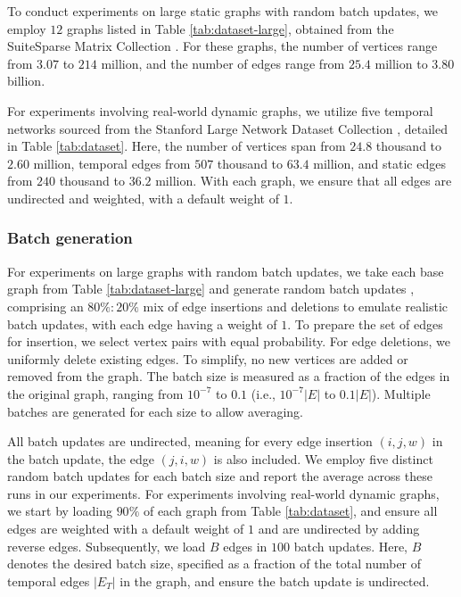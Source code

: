 To conduct experiments on large static graphs with random batch updates, we employ $12$ graphs listed in Table \ref{tab:dataset-large}, obtained from the SuiteSparse Matrix Collection \cite{suite19}. For these graphs, the number of vertices range from $3.07$ to $214$ million, and the number of edges range from $25.4$ million to $3.80$ billion. For experiments involving real-world dynamic graphs, we utilize five temporal networks sourced from the Stanford Large Network Dataset Collection \cite{snapnets}, detailed in Table \ref{tab:dataset}. Here, the number of vertices span from $24.8$ thousand to $2.60$ million, temporal edges from $507$ thousand to $63.4$ million, and static edges from $240$ thousand to $36.2$ million. With each graph, we ensure that all edges are undirected and weighted, with a default weight of $1$.





\subsubsection{Batch generation}
\label{sec:batch-generation}

For experiments on large graphs with random batch updates, we take each base graph from Table \ref{tab:dataset-large} and generate random batch updates \cite{com-zarayeneh21}, comprising an $80\% : 20\%$ mix of edge insertions and deletions to emulate realistic batch updates, with each edge having a weight of $1$. To prepare the set of edges for insertion, we select vertex pairs with equal probability. For edge deletions, we uniformly delete existing edges. To simplify, no new vertices are added or removed from the graph. The batch size is measured as a fraction of the edges in the original graph, ranging from $10^{-7}$ to $0.1$ (i.e., $10^{-7}|E|$ to $0.1|E|$). Multiple batches are generated for each size to allow averaging. All batch updates are undirected, meaning for every edge insertion $(i, j, w)$ in the batch update, the edge $(j, i, w)$ is also included. We employ five distinct random batch updates for each batch size and report the average across these runs in our experiments. For experiments involving real-world dynamic graphs, we start by loading $90\%$ of each graph from Table \ref{tab:dataset}, and ensure all edges are weighted with a default weight of $1$ and are undirected by adding reverse edges. Subsequently, we load $B$ edges in $100$ batch updates. Here, $B$ denotes the desired batch size, specified as a fraction of the total number of temporal edges $|E_T|$ in the graph, and ensure the batch update is undirected.


